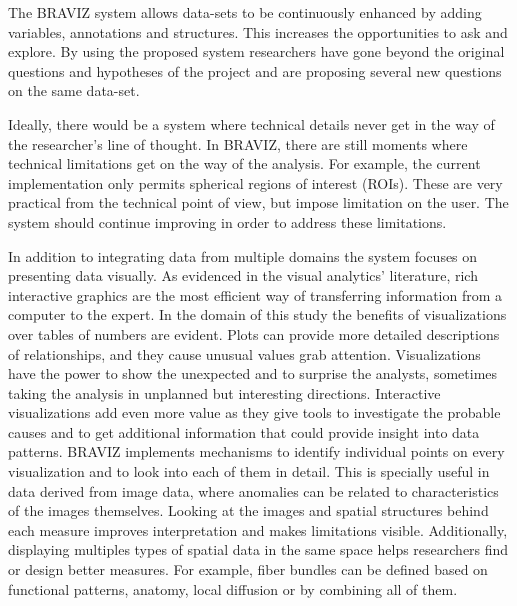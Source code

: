 {The BRAVIZ system allows data-sets to be continuously enhanced by adding variables, annotations and structures. This increases the opportunities to ask and explore.  By using the proposed system researchers have gone beyond the original questions and hypotheses of the project and are proposing several new questions on the same data-set. 

Ideally, there would be a system where technical details never get in the way of the researcher's line of thought. In BRAVIZ, there are still moments where technical limitations get on the way of the analysis.  For example, the current implementation only permits spherical regions of interest (ROIs). These are very practical from the technical point of view, but impose limitation on the user. The system should continue improving in order to address these limitations.

In addition to integrating data from multiple domains the system focuses on presenting data visually. As evidenced in the visual analytics' literature, rich interactive graphics are the most efficient way of transferring information from a computer to the expert. In the domain of this study the benefits of visualizations over tables of numbers are evident. Plots can provide more detailed descriptions of relationships, and they cause unusual values grab attention. Visualizations have the power to show the unexpected and to surprise the analysts, sometimes taking the analysis in unplanned but interesting directions. Interactive visualizations add even more value as they give tools to investigate the probable causes and to get additional information that could provide insight into data patterns. BRAVIZ implements mechanisms to identify individual points on every visualization and to look into each of them in detail. This is specially useful in data derived from image data, where anomalies can be related to characteristics of the images themselves. Looking at the images and spatial structures behind each measure improves interpretation and makes limitations visible. Additionally, displaying multiples types of spatial data in the same space helps researchers find or design better measures. For example, fiber bundles can be defined based on functional patterns, anatomy, local diffusion or by combining all of them.

}
